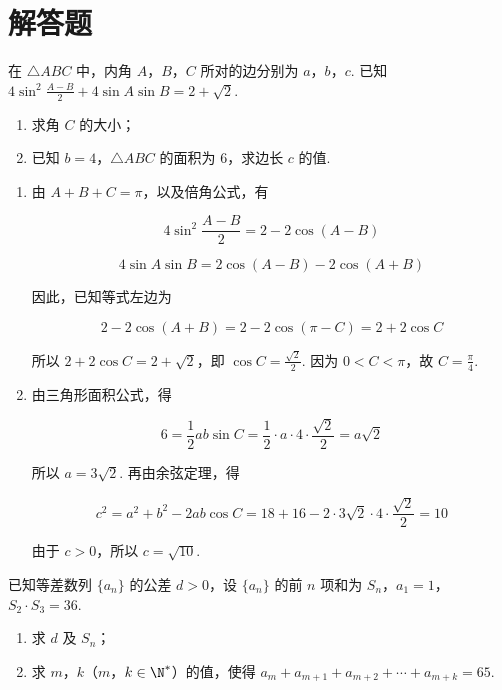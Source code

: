 \section{解答题}

\begin{problem}
在 \(\triangle ABC\) 中，内角 \(A\)，\(B\)，\(C\) 所对的边分别为 \(a\)，\(b\)，\(c\). 已知 \(4\sin^2\frac{A - B}{2} + 4\sin A\sin B = 2 + \sqrt{2}\).

\begin{enumerate}
\item 求角 \(C\) 的大小；
\item 已知 \(b = 4\)，\(\triangle ABC\) 的面积为 6，求边长 \(c\) 的值.
\end{enumerate}
\end{problem}

\begin{solution}
\begin{enumerate}
\item 由 \(A+B+C=\pi\)，以及倍角公式，有

\[
4\sin^2\frac{A-B}{2}=2-2\cos(A-B)
\]

\[
4\sin A\sin B=2\cos(A-B)-2\cos(A+B)
\]

因此，已知等式左边为

\[
2-2\cos(A+B)=2-2\cos(\pi-C)=2+2\cos C
\]

所以 \(2+2\cos C=2+\sqrt{2}\)，即 \(\cos C=\frac{\sqrt{2}}{2}\). 因为 \(0<C<\pi\)，故 \(C=\frac{\pi}{4}\).

\item 由三角形面积公式，得

\[
6=\frac{1}{2}ab\sin C=\frac{1}{2}\cdot a\cdot4\cdot\frac{\sqrt{2}}{2}=a\sqrt{2}
\]

所以 \(a=3\sqrt{2}\). 再由余弦定理，得

\[
c^2=a^2+b^2-2ab\cos C=18+16-2\cdot3\sqrt{2}\cdot4\cdot\frac{\sqrt{2}}{2}=10
\]

由于 \(c>0\)，所以 \(c=\sqrt{10}\).
\end{enumerate}
\end{solution}

\begin{problem}
已知等差数列 \(\{a_{n}\}\) 的公差 \(d > 0\)，设 \(\{a_{n}\}\) 的前 \(n\) 项和为 \(S_{n}\)，\(a_{1} = 1\)，\(S_{2} \cdot S_{3} = 36\).

\begin{enumerate}
\item 求 \(d\) 及 \(S_{n}\)；
\item 求 \(m\)，\(k\)（\(m\)，\(k \in \N^*\)）的值，使得 \(a_m + a_{m+1} + a_{m+2} + \cdots + a_{m+k} = 65\).
\end{enumerate}
\end{problem}

